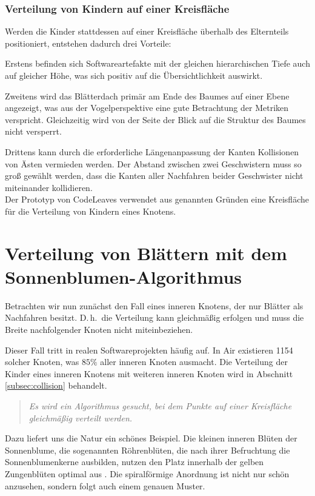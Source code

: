 \subsubsection*{Verteilung von Kindern auf einer Kreisfläche}
Werden die Kinder stattdessen auf einer Kreisfläche überhalb des Elternteils positioniert, entstehen dadurch drei Vorteile:

Erstens befinden sich Softwareartefakte mit der gleichen hierarchischen Tiefe auch auf gleicher Höhe, was sich positiv auf die Übersichtlichkeit auswirkt.

Zweitens wird das Blätterdach primär am Ende des Baumes auf einer Ebene angezeigt, was aus der Vogelperspektive eine gute Betrachtung der Metriken verspricht. Gleichzeitig wird von der Seite der Blick auf die Struktur des Baumes nicht versperrt.

Drittens kann durch die erforderliche Längenanpassung der Kanten Kollisionen von Ästen vermieden werden. Der Abstand zwischen zwei Geschwistern muss so groß gewählt werden, dass die Kanten aller Nachfahren beider Geschwister nicht miteinander kollidieren.\\

Der Prototyp von CodeLeaves verwendet aus genannten Gründen eine Kreisfläche für die Verteilung von Kindern eines Knotens.

\section{Verteilung von Blättern mit dem Sonnenblumen-Algorithmus}
\label{sec:sunflower}

Betrachten wir nun zunächst den Fall eines inneren Knotens, der nur Blätter als Nachfahren besitzt. D.\,h.\ die Verteilung kann gleichmäßig erfolgen und muss die Breite nachfolgender Knoten nicht miteinbeziehen.

Dieser Fall tritt in realen Softwareprojekten häufig auf. In Air existieren 1154 solcher Knoten, was $85\%$ aller inneren Knoten ausmacht. Die Verteilung der Kinder eines inneren Knotens mit weiteren inneren Knoten wird in Abschnitt \ref{subsec:collision} behandelt.

\begin{quote}
  \textit{Es wird ein Algorithmus gesucht, bei dem Punkte auf einer Kreisfläche gleichmäßig verteilt werden.}
\end{quote}

Dazu liefert uns die Natur ein schönes Beispiel. Die kleinen inneren Blüten der Sonnenblume, die sogenannten Röhrenblüten, die nach ihrer Befruchtung die Sonnenblumenkerne ausbilden, nutzen den Platz innerhalb der gelben Zungenblüten optimal aus \cite{zimmermann2017sonnenblume}. Die spiralförmige Anordnung ist nicht nur schön anzusehen, sondern folgt auch einem genauen Muster.

